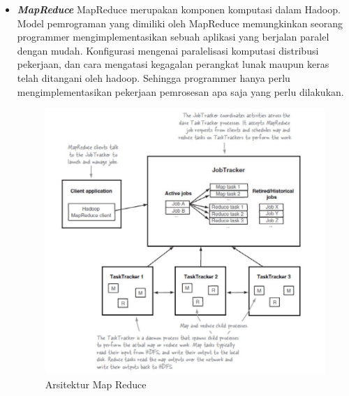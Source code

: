 \documentclass[a4paper,twoside]{article}
\begin{document}
\begin{enumerate}
{\begin{itemize}
{		Komponen HDFS pada master node menjalankan sebuah daemon yang disebut dengan NameNode. 					NameNode bertugas untuk mengatur pembagian blok-blok data ke slave node dan mencatat 					lokasi masing-masing blok data tersebut. NameNode Merupakan komponen yang penting dalam 				ekseskusi pemrosesan data dalam klaster. Berbeda dengan Master Node, komponen HDFS pada 				slave node menjalankan daemon yang disebut dengan DataNode. Data Node bertugas untuk 					melakukan proses baca tulis blok-blok data pada file asli yang terdapat sistem file 					lokal. Komunikasi pada awal operasi tulis atau baca terjadi diantara klien dan NameNode 				untuk mendapatkan lokasi blok-blok data yang akan diproses. setelah itu klien dapat 					berkomunikasi dengan DataNode lain untuk melakukan replikasi blok-blok data yang ada. 
	}
	
		\item[]{\textbf{\textit{MapReduce}}\newline
		MapReduce merupakan komponen komputasi dalam Hadoop. Model pemrograman yang dimiliki 					oleh MapReduce memungkinkan seorang programmer mengimplementasikan sebuah aplikasi yang 				berjalan paralel dengan mudah. Konfigurasi mengenai paralelisasi komputasi distribusi 					pekerjaan, dan cara mengatasi kegagalan perangkat lunak maupun keras telah ditangani
		oleh hadoop. Sehingga programmer hanya perlu mengimplementasikan pekerjaan pemrosesan 					apa saja yang perlu dilakukan.\newline
	
		\begin{figure}[H] 
		\centering  
		\includegraphics[scale=0.5]{Arsitektur-MapReduce}  
		\caption[Gambar Arsitektur Map Reduce]{Arsitektur Map Reduce} 
		\label{fig:processing-events relationship} 
		\end{figure}
	
}
\end{itemize}}
\end{enumerate}
\end{document}
